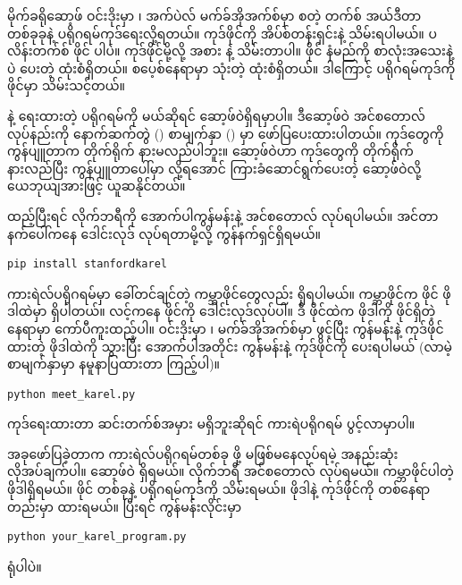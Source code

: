 မိုက်ခရိုဆော့ဖ် ဝင်းဒိုးမှာ  ၊ အက်ပဲလ် မက်ခ်အိုအက်စ်မှာ   စတဲ့ တက်စ် အယ်ဒီတာတစ်ခုခုနဲ့ ပရိုဂရမ်ကုဒ်ရေးလို့ရတယ်။ ကုဒ်ဖိုင်ကို  အိပ်စ်တန်းရှင်းနဲ့ သိမ်းရပါမယ်။ ပလိန်းတက်စ်  ဖိုင် ပါပဲ။  ကုဒ်ဖိုင်မို့လို့  အစား  နဲ့ သိမ်းတာပါ။  ဖိုင် နံမည်ကို စာလုံးအသေးနဲ့ပဲ ပေးတဲ့ ထုံးစံရှိတယ်။  စပေ့စ်နေရာမှာ \mytcboxinl{\fEnSnd{ \_}}  သုံးတဲ့ ထုံးစံရှိတယ်။ ဒါကြောင့်  ပရိုဂရမ်ကုဒ်ကို  ဖိုင်မှာ သိမ်းသင့်တယ်။ 

 နဲ့ ရေးထားတဲ့ ပရိုဂရမ်ကို  မယ်ဆိုရင်  ဆော့ဖ်ဝဲရှိရမှာပါ။ ဒီဆော့ဖ်ဝဲ အင်စတောလ် လုပ်နည်းကို နောက်ဆက်တွဲ (\fRefNo{\ref{apdx:01}}) စာမျက်နှာ (\fRefNo{\pageref{subsec:pyinstl}}) မှာ ဖော်ပြပေးထားပါတယ်။  ကုဒ်တွေကို ကွန်ပျူတာက တိုက်ရိုက် နားမလည်ပါဘူး။  ဆော့ဖ်ဝဲဟာ  ကုဒ်တွေကို တိုက်ရိုက် နားလည်ပြီး ကွန်ပျူတာပေါ်မှာ  လို့ရအောင် ကြားခံဆောင်ရွက်ပေးတဲ့ ဆော့ဖ်ဝဲလို့ ယေဘုယျအားဖြင့် ယူဆနိုင်တယ်။

 ထည့်ပြီးရင်  လိုက်ဘရီကို အောက်ပါကွန်မန်းနဲ့ အင်စတောလ် လုပ်ရပါမယ်။ အင်တာနက်ပေါ်ကနေ ဒေါင်းလုဒ် လုပ်ရတာမို့လို့ ကွန်နက်ရှင်ရှိရမယ်။
%
\begin{verbatim}
pip install stanfordkarel
\end{verbatim}
%

ကားရဲလ်ပရိုဂရမ်မှာ ခေါ်တင်ချင်တဲ့ ကမ္ဘာဖိုင်တွေလည်း ရှိရပါမယ်။   ကမ္ဘာဖိုင်က  ဖိုင်  ဖိုဒါထဲမှာ ရှိပါတယ်။   လင့်ကနေ   ဖိုင်ကို ဒေါင်းလုဒ်လုပ်ပါ။ ဒီ  ဖိုင်ထဲက  ဖိုဒါကို  ဖိုင်ရှိတဲ့နေရာမှာ ကော်ပီကူးထည့်ပါ။ ဝင်းဒိုးမှာ  ၊ မက်ခ်အိုအက်စ်မှာ   ဖွင့်ပြီး  ကွန်မန်းနဲ့ ကုဒ်ဖိုင်ထားတဲ့ ဖိုဒါထဲကို သွားပြီး အောက်ပါအတိုင်း  ကွန်မန်းနဲ့ ကုဒ်ဖိုင်ကို  ပေးရပါမယ် (လာမဲ့စာမျက်နှာမှာ နမူနာပြထားတာ ကြည့်ပါ)။ 
%
\begin{verbatim}
python meet_karel.py
\end{verbatim}
ကုဒ်ရေးထားတာ ဆင်းတက်စ်အမှား မရှိဘူးဆိုရင် ကားရဲပရိုဂရမ် ပွင့်လာမှာပါ။

အခုဖော်ပြခဲ့တာက ကားရဲလ်ပရိုဂရမ်တစ်ခု  ဖို့ မဖြစ်မနေလုပ်ရမဲ့ အနည်းဆုံးလိုအပ်ချက်ပါ။  ဆော့ဖ်ဝဲ ရှိရမယ်။  လိုက်ဘရီ အင်စတောလ် လုပ်ရမယ်။ ကမ္ဘာဖိုင်ပါတဲ့  ဖိုဒါရှိရမယ်။  ဖိုင် တစ်ခုနဲ့ ပရိုဂရမ်ကုဒ်ကို သိမ်းရမယ်။  ဖိုဒါနဲ့ ကုဒ်ဖိုင်ကို တစ်နေရာတည်းမှာ ထားရမယ်။ ပြီးရင် ကွန်မန်းလိုင်းမှာ 
%
\begin{verbatim}
python your_karel_program.py
\end{verbatim}
 ရုံပါပဲ။


